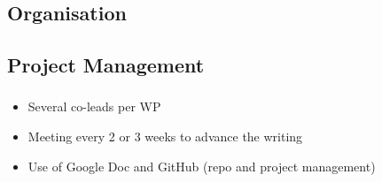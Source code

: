 \subsection{Organisation}

\subsection{Project Management}
\begin{frame}
  \frametitle{\insertsectionhead}
  \framesubtitle{\insertsubsectionhead}

  \begin{itemize}
    \item Several co-leads per WP 
    \item Meeting every 2 or 3 weeks to advance the writing
    \item Use of Google Doc and GitHub (repo and project management)
  \end{itemize}

\end{frame}


